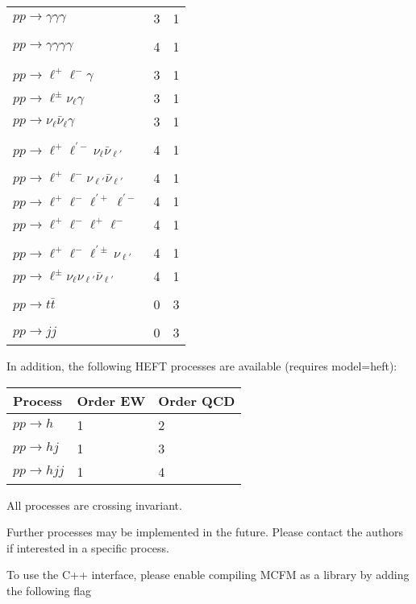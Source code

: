 \begin{longtable}[]{@{}lll@{}}
\(pp\to \gamma \gamma \gamma\) & 3 & 1 \\
& & \\
\(pp\to \gamma \gamma \gamma \gamma\) & 4 & 1 \\
& & \\
\(pp\to \ell^+\ell^-\gamma\) & 3 & 1 \\
\(pp\to \ell^\pm\nu_\ell\gamma\) & 3 & 1 \\
\(pp\to \nu_\ell\bar\nu_\ell\gamma\) & 3 & 1 \\
& & \\
\(pp\to \ell^+\ell^{\prime-}\nu_\ell\bar\nu_{\ell'}\) & 4 & 1 \\
& & \\
\(pp\to \ell^+\ell^-\nu_{\ell'}\bar\nu_{\ell'}\) & 4 & 1 \\
\(pp\to \ell^+\ell^-\ell^{\prime+}\ell^{\prime-}\) & 4 & 1 \\
\(pp\to \ell^+\ell^-\ell^+\ell^-\) & 4 & 1 \\
& & \\
\(pp\to \ell^+\ell^-\ell^{\prime\pm}\nu_{\ell'}\) & 4 & 1 \\
\(pp\to \ell^\pm\nu_\ell\nu_{\ell'}\bar\nu_{\ell'}\) & 4 & 1 \\
& & \\
\(pp\to t \bar t\) & 0 & 3 \\
& & \\
\(pp\to j j\) & 0 & 3 \\
\hline
\end{longtable}

In addition, the following HEFT processes are available (requires
model=heft):

\begin{longtable}[]{@{}lll@{}}
\hline
Process & Order EW & Order QCD \\
\hline
\endhead
\(pp\to h\) & 1 & 2 \\
\(pp\to h j\) & 1 & 3 \\
\(pp\to h j j\) & 1 & 4 \\
\hline
\end{longtable}

All processes are crossing invariant.

Further processes may be
implemented in the future. Please contact the authors if interested in a
specific process.

\hypertarget{installation}{%
\label{installation}}

To use the C++ interface, please enable compiling MCFM as a library by
adding the following flag

